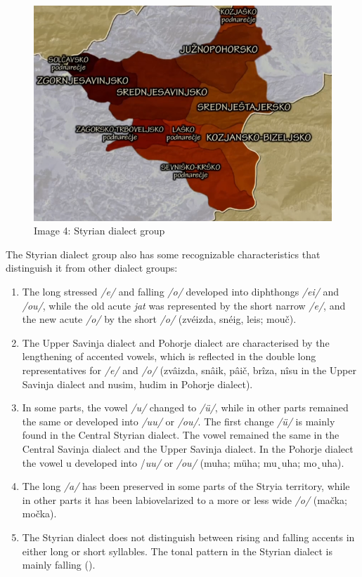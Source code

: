 \documentclass[fleqn,moreauthors,10pt]{ds_report}
\begin{document}
\begin{figure}
    \centering
    \includegraphics[width=1\linewidth]{styria.png}
    \caption{Image 4: Styrian dialect group
}
    \label{fig:map}
\end{figure}


    The Styrian dialect group also has some recognizable characteristics that distinguish it from other dialect groups: 

\begin{enumerate}
    \item The long stressed \textit{/e/} and falling \textit{/o/} developed into diphthongs \textit{/ei/} and \textit{/ou/}, while the old acute \textit{jat} was represented by the short narrow \textit{/e/}, and the new acute \textit{/o/} by the short \textit{/o/} (zvéizda, snéig, leis; mouč).

    \item The Upper Savinja dialect and Pohorje dialect are characterised by the lengthening of accented vowels, which is reflected in the double long representatives for \textit{/e/} and \textit{/o/} (zvâizda, snâik, pâič, brîza, nîsu in the Upper Savinja dialect and nusim, hudim in Pohorje dialect). 

    \item In some parts, the vowel \textit{/u/} changed to \textit{/ü/}, while in other parts remained the same or developed into \textit{/uu/} or \textit{/ou/}. The first change \textit{/ü/} is mainly found in the Central Styrian dialect. The vowel remained the same in the Central Savinja dialect and the Upper Savinja dialect. In the Pohorje dialect the vowel u developed into /\textit{uu/} or \textit{/ou/} (muha; müha; mu˛uha; mo˛uha).

    \item The long \textit{/a/} has been preserved in some parts of the Stryia territory, while in other parts it has been labiovelarized to a more or less wide \textit{/o/} (mačka; močka).

    \item The Styrian dialect does not distinguish between rising and falling accents in either long or short syllables. The tonal pattern in the Styrian dialect is mainly falling (\cite{Logar 1975}).
\end{enumerate}
\end{document}
